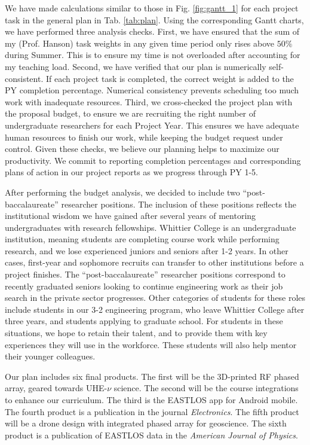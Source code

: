 \documentclass[11pt]{amsart}
\begin{document}
We have made calculations similar to those in Fig. \ref{fig:gantt_1} for each project task in the general plan in Tab. \ref{tab:plan}.  Using the corresponding Gantt charts, we have performed three analysis checks.  First, we have ensured that the sum of my (Prof. Hanson) task weights in any given time period only rises above $50\%$ during Summer.  This is to ensure my time is not overloaded after accounting for my teaching load.  Second, we have verified that our plan is numerically self-consistent.  If each project task is completed, the correct weight is added to the PY completion percentage.  Numerical consistency prevents scheduling too much work with inadequate resources.  Third, we cross-checked the project plan with the proposal budget, to ensure we are recruiting the right number of undergraduate researchers for each Project Year.  This ensures we have adequate human resources to finish our work, while keeping the budget request under control.  Given these checks, we believe our planning helps to maximize our productivity.  We commit to reporting completion percentages and corresponding plans of action in our project reports as we progress through PY 1-5.

After performing the budget analysis, we decided to include two ``post-baccalaureate'' researcher positions.  The inclusion of these positions reflects the institutional wisdom we have gained after several years of mentoring undergraduates with research fellowships.  Whittier College is an undergraduate institution, meaning students are completing course work while performing research, and we lose experienced juniors and seniors after 1-2 years.  In other cases, first-year and sophomore recruits can transfer to other institutions before a project finishes.  The ``post-baccalaureate'' researcher positions correspond to recently graduated seniors looking to continue engineering work as their job search in the private sector progresses.  Other categories of students for these roles include students in our 3-2 engineering program, who leave Whittier College after three years, and students applying to graduate school. For students in these situations, we hope to retain their talent, and to provide them with key experiences they will use in the workforce.  These students will also help mentor their younger colleagues.

Our plan includes six final products.  The first will be the 3D-printed RF phased array, geared towards UHE-$\nu$ science.  The second will be the course integrations to enhance our curriculum.  The third is the EASTLOS app for Android mobile.  The fourth product is a publication in the journal \textit{Electronics}.  The fifth product will be a drone design with integrated phased array for geoscience.  The sixth product is a publication of EASTLOS data in the \textit{American Journal of Physics}.
\end{document}
